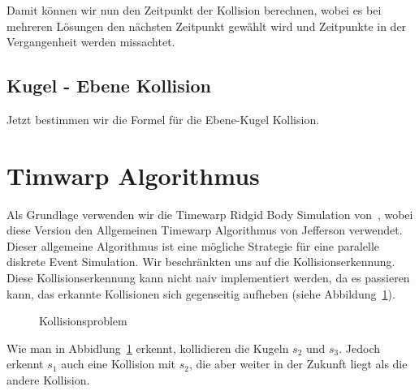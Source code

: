 \documentclass[a4paper, 10pt, openright, parskip, chapterprefix]{scrreprt}
\begin{document}
\noindent Damit können wir nun den Zeitpunkt der Kollision berechnen, wobei es bei mehreren Lösungen den nächsten Zeitpunkt gewählt wird und Zeitpunkte in der Vergangenheit werden missachtet. 

\subsection{Kugel - Ebene Kollision}
Jetzt bestimmen wir die Formel für die Ebene-Kugel Kollision.
\section{Timwarp Algorithmus}
\label{sec:TimewarpAlgoritmus}
Als Grundlage verwenden wir die Timewarp Ridgid Body Simulation von~\cite{timewarp}, wobei diese Version  den Allgemeinen Timewarp Algorithmus von Jefferson verwendet. Dieser allgemeine Algorithmus ist eine mögliche Strategie für eine paralelle diskrete Event Simulation. Wir beschränkten uns auf die Kollisionserkennung. Diese Kollisionserkennung kann nicht naiv implementiert werden, da es passieren kann, das erkannte Kollisionen sich gegenseitig aufheben (siehe Abbildung~\ref{abb:kollision}).

\begin{figure}[t]
\centering{}
\caption{Kollisionsproblem}
\label{abb:kollision}
\end{figure}

Wie man in Abbidlung~\ref{abb:kollision} erkennt, kollidieren die Kugeln $s_2$ und $s_3$. Jedoch erkennt $s_1$ auch eine Kollision mit $s_2$, die aber weiter in der Zukunft liegt als die andere Kollision.
\end{document}
